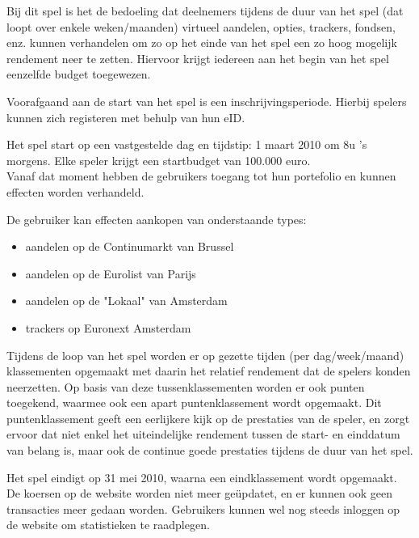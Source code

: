 Bij dit spel is het de bedoeling dat deelnemers tijdens de duur van het spel (dat loopt over enkele weken/maanden) virtueel aandelen, opties, trackers, fondsen, enz. kunnen verhandelen om zo op het einde van het spel een zo hoog mogelijk rendement neer te zetten. Hiervoor krijgt iedereen aan het begin van het spel eenzelfde budget toegewezen. 


Voorafgaand aan de start van het spel is een inschrijvingsperiode. Hierbij spelers kunnen zich registeren met behulp van hun eID. 


Het spel start op een vastgestelde dag en tijdstip: 1 maart 2010 om 8u 's morgens. Elke speler krijgt een startbudget van 100.000 euro.
\\Vanaf dat moment hebben de gebruikers toegang tot hun portefolio en kunnen effecten worden verhandeld.


De gebruiker kan effecten aankopen van onderstaande types:
\begin{itemize}
  \setlength{\itemsep}{1pt}
  \setlength{\parskip}{0pt}
  \setlength{\parsep}{0pt}
	\item{aandelen op de Continumarkt van Brussel}
	\item{aandelen op de Eurolist van Parijs}
	\item{aandelen op de "Lokaal" van Amsterdam}
	\item{trackers op Euronext Amsterdam}
\end{itemize}

Tijdens de loop van het spel worden er op gezette tijden (per dag/week/maand) klassementen opgemaakt met daarin het relatief rendement dat de spelers konden neerzetten. Op basis van deze tussenklassementen worden er ook punten toegekend, waarmee ook een apart puntenklassement wordt opgemaakt. Dit puntenklassement geeft een eerlijkere kijk op de prestaties van de speler, en zorgt ervoor dat niet enkel het uiteindelijke rendement tussen de start- en einddatum van belang is, maar ook de continue goede prestaties tijdens de duur van het spel.

Het spel eindigt op 31 mei 2010, waarna een eindklassement wordt opgemaakt. De koersen op de website worden niet meer ge\"updatet, en er kunnen ook geen transacties meer gedaan worden. Gebruikers kunnen wel nog steeds inloggen op de website om statistieken te raadplegen.
